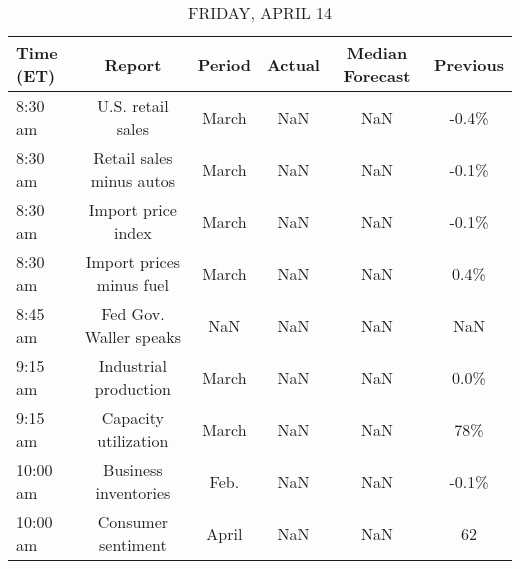 \documentclass{article}%
\begin{document}
%


\begin{table}[htbp]%
\caption{FRIDAY, APRIL 14}%
\centering%
\begin{adjustbox}{width=1\textwidth}%
\begin{tabular}{lccccc}
\toprule
Time (ET) &                   Report & Period & Actual & Median Forecast & Previous \\
\midrule
  8:30 am &        U.S. retail sales &  March &    NaN &             NaN &    -0.4\% \\
  8:30 am & Retail sales minus autos &  March &    NaN &             NaN &    -0.1\% \\
  8:30 am &       Import price index &  March &    NaN &             NaN &    -0.1\% \\
  8:30 am & Import prices minus fuel &  March &    NaN &             NaN &     0.4\% \\
  8:45 am &   Fed Gov. Waller speaks &    NaN &    NaN &             NaN &      NaN \\
  9:15 am &    Industrial production &  March &    NaN &             NaN &     0.0\% \\
  9:15 am &     Capacity utilization &  March &    NaN &             NaN &      78\% \\
 10:00 am &     Business inventories &   Feb. &    NaN &             NaN &    -0.1\% \\
 10:00 am &       Consumer sentiment &  April &    NaN &             NaN &       62 \\
\bottomrule
\end{tabular}
%
\end{adjustbox}%
\end{table}
\end{document}
